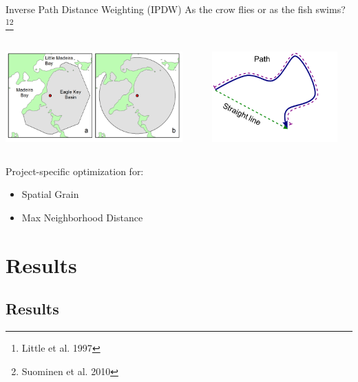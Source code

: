 \documentclass[compress,noflama,nosectionpages]{beamer}
\begin{document}
\begin{frame}{Inverse Path Distance Weighting (IPDW)}
	As the crow flies or as the fish swims?\footnote{Little et al. 1997}\footnote[frame]{Suominen et al. 2010}
	\vspace{6pt}
 	\begin{columns}
   	\begin{column}{6.8cm}
     	\includegraphics[width=6.8cm,keepaspectratio=true,clip=true,trim= 0mm 0mm 0mm 0mm]{figures/sm-figure1.png}
 		\end{column}

 		\begin{column}{5.4cm}
     	\includegraphics[width=4.8cm,keepaspectratio=true]{images/Picture1.png}
   	\end{column}
 \end{columns}
	Project-specific optimization for:
	\begin{itemize}
		\item{Spatial Grain}
		\item{Max Neighborhood Distance}
	\end{itemize}
	\vspace{4pt}
\end{frame}

\section{Results}
	\subsection{Results}
\end{document}
